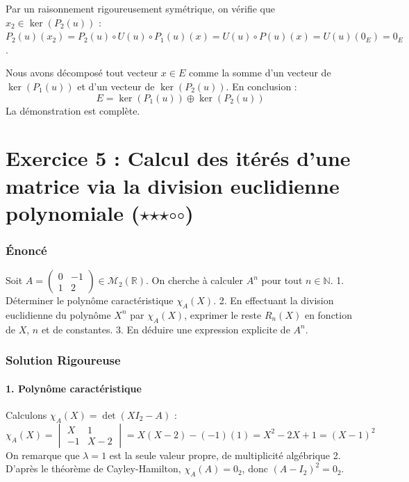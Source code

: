 \documentclass[11pt,a4paper]{article}
\begin{document}
Par un raisonnement rigoureusement symétrique, on vérifie que $x_2 \in \ker(P_2(u))$ :
$P_2(u)(x_2) = P_2(u) \circ U(u) \circ P_1(u) (x) = U(u) \circ P(u)(x) = U(u)(0_E) = 0_E$.

Nous avons décomposé tout vecteur $x \in E$ comme la somme d'un vecteur de $\ker(P_1(u))$ et d'un vecteur de $\ker(P_2(u))$.
En conclusion :
$$E = \ker(P_1(u)) \oplus \ker(P_2(u))$$
La démonstration est complète.




\part{Exercice 5 : Calcul des itérés d'une matrice via la division euclidienne polynomiale ($\star$$\star$$\star$$\circ$$\circ$)}

\section{Énoncé}

Soit $A = \begin{pmatrix} 0 & -1 \\ 1 & 2 \end{pmatrix} \in \mathcal{M}_2(\mathbb{R})$.
On cherche à calculer $A^n$ pour tout $n \in \mathbb{N}$.
1. Déterminer le polynôme caractéristique $\chi_A(X)$.
2. En effectuant la division euclidienne du polynôme $X^n$ par $\chi_A(X)$, exprimer le reste $R_n(X)$ en fonction de $X$, $n$ et de constantes.
3. En déduire une expression explicite de $A^n$.

\section{Solution Rigoureuse}

\subsection{1. Polynôme caractéristique}
Calculons $\chi_A(X) = \det(X I_2 - A)$ :
$$\chi_A(X) = \begin{vmatrix} X & 1 \\ -1 & X - 2 \end{vmatrix} = X(X - 2) - (-1)(1) = X^2 - 2X + 1 = (X - 1)^2$$
On remarque que $\lambda = 1$ est la seule valeur propre, de multiplicité algébrique 2.
D'après le théorème de Cayley-Hamilton, $\chi_A(A) = 0_2$, donc $(A - I_2)^2 = 0_2$.
\end{document}
